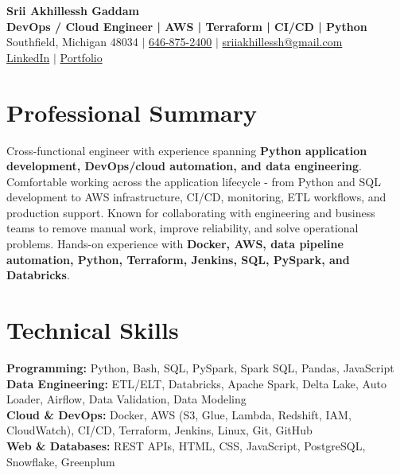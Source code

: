 \documentclass[letterpaper,10pt]{article}
\begin{document}
\fontsize{9.35pt}{10.45pt}\selectfont

\begin{center}
    {\LARGE \textbf{Srii Akhillessh Gaddam}} \\[-1pt]
    \textbf{DevOps / Cloud Engineer | AWS | Terraform | CI/CD | Python} \\[2pt]
    Southfield, Michigan 48034 $|$
    \href{tel:6468752400}{646-875-2400} $|$
    \href{mailto:sriiakhillessh@gmail.com}{sriiakhillessh@gmail.com} \\[1pt]
    \href{https://www.linkedin.com/in/srii-akhiilessh-gaddam-b48668191/}{LinkedIn} $|$
    \href{https://sriiakhillesshg.github.io/portfolio/}{Portfolio}
\end{center}
\vspace{-8pt}

\section{Professional Summary}
\small{Cross-functional engineer with experience spanning \textbf{Python application development, DevOps/cloud automation, and data engineering}. Comfortable working across the application lifecycle - from Python and SQL development to AWS infrastructure, CI/CD, monitoring, ETL workflows, and production support. Known for collaborating with engineering and business teams to remove manual work, improve reliability, and solve operational problems. Hands-on experience with \textbf{Docker, AWS, data pipeline automation, Python, Terraform, Jenkins, SQL, PySpark, and Databricks}.}

\section{Technical Skills}
\small{
\textbf{Programming:} Python, Bash, SQL, PySpark, Spark SQL, Pandas, JavaScript \\
\textbf{Data Engineering:} ETL/ELT, Databricks, Apache Spark, Delta Lake, Auto Loader, Airflow, Data Validation, Data Modeling \\
\textbf{Cloud \& DevOps:} Docker, AWS (S3, Glue, Lambda, Redshift, IAM, CloudWatch), CI/CD, Terraform, Jenkins, Linux, Git, GitHub \\
\textbf{Web \& Databases:} REST APIs, HTML, CSS, JavaScript, PostgreSQL, Snowflake, Greenplum
}
\end{document}
